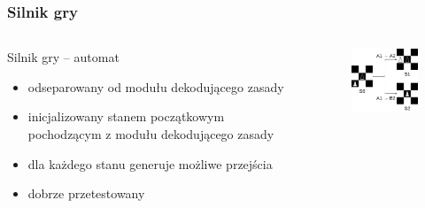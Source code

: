 \documentclass{beamer}
\begin{document}
\begin{frame}
	\frametitle{Silnik gry}
	\begin{columns}
		\begin{column}{.50\textwidth}
			Silnik gry -- automat
			\begin{itemize}
				\item odseparowany od modułu dekodującego zasady
				\item inicjalizowany stanem początkowym pochodzącym z modułu dekodującego zasady
				\item dla każdego stanu generuje możliwe przejścia
				\item dobrze przetestowany
			\end{itemize}
		\end{column}%
		\hfill
		\begin{column}{.50\textwidth}
			\begin{figure}
				\includegraphics[width=4.5cm]{stany.png}
				\centering
			\end{figure}
		\end{column}
	\end{columns}
\end{frame}

\end{document}
